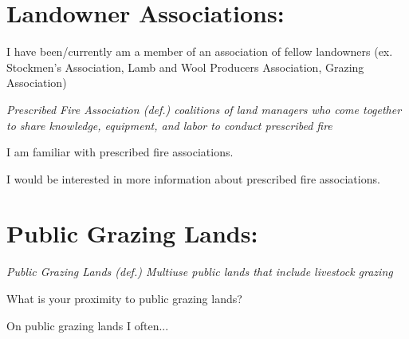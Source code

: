 \documentclass[
  english,
  ]{sdapsclassic}
\begin{document}
\begin{questionnaire}
\begin{multicols}{2}
    \end{multicols}
    
    \section{Landowner Associations:}
    
    \begin{choicequestion}[cols=2]{I have been/currently am a member of an association of fellow landowners (ex. Stockmen's Association, Lamb and Wool Producers Association, Grazing Association)}
    \end{choicequestion}
    
    
    \emph{Prescribed Fire Association (def.) coalitions of land managers who come together to share knowledge, equipment, and labor to conduct prescribed fire}
    
    \begin{choicequestion}[cols=2]{I am familiar with prescribed fire associations.}
    \end{choicequestion}    
    
    \begin{choicequestion}[cols=2]{I would be interested in more information about prescribed fire associations.}
    \end{choicequestion}    
    
    \section{Public Grazing Lands:}
    
    \emph{Public Grazing Lands (def.) Multiuse public lands that include livestock grazing}
    
    \begin{choicequestion}[cols=5]{What is your proximity to public grazing lands?}
    \end{choicequestion}
    
     \begin{markgroup}{On public grazing lands I often...}
    \end{markgroup}   
    

\end{questionnaire}
\end{document}
